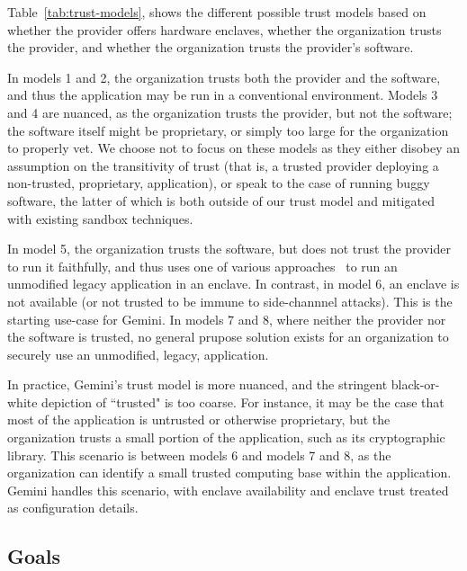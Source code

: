 Table~\ref{tab:trust-models}, shows the different possible trust models based
on whether the provider offers hardware enclaves, whether the organization
trusts the provider, and whether the organization trusts the provider's
software.


In models 1 and 2, the organization trusts both
the provider and the software, and thus the application may be run in a
conventional environment.
%
Models 3 and 4 are nuanced, as the organization trusts the provider, but not
the software; the software itself might be proprietary, or simply too large for
the organization to properly vet.
%
We choose not to focus on these models as they either disobey an assumption on
the transitivity of trust (that is, a trusted provider deploying a non-trusted,
proprietary, application), or speak to the case of running buggy software,
the latter of which is both outside of our trust model and mitigated with
existing sandbox techniques.


In model 5, the organization trusts the software, but does not trust the
provider to run it faithfully, and thus uses one of various
approaches~\cite{talos,haven,scone,graphene} to
run an unmodified legacy application in an enclave.
%
In contrast, in model 6, an enclave is not available (or not trusted to be
immune to side-channnel attacks).
%
This is the starting use-case for Gemini.
%
In models 7 and 8, where neither the provider nor the software is trusted, no
general prupose solution exists for an organization to securely use an
unmodified, legacy, application.



In practice, Gemini's trust model is more nuanced, and the stringent
black-or-white depiction of ``trusted" is too coarse.
%
For instance, it may be the case that most of the application is untrusted or
otherwise proprietary, but the organization trusts a small portion of the
application, such as its cryptographic library.
%
This scenario is between models 6 and models 7 and 8, as the organization can
identify a small trusted computing base within the application.
%
Gemini handles this scenario, with enclave availability and enclave trust
treated as configuration details.


\subsection{Goals}

